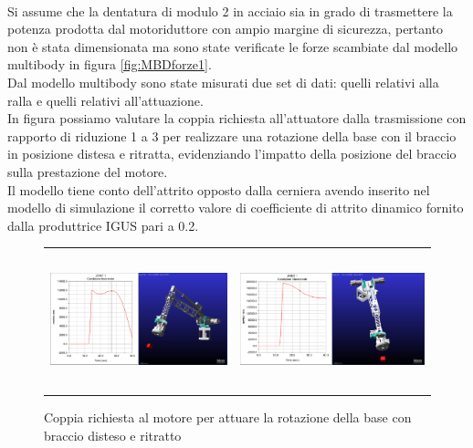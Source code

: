 \documentclass[%
corpo=11pt,
twoside,
 stile=classica,
oldstyle,
greek,%
]{toptesi}
\begin{document}
		\\
		Si assume che la dentatura di modulo 2 in acciaio sia in grado di trasmettere la potenza prodotta dal motoriduttore con ampio margine di sicurezza, pertanto non è stata dimensionata ma sono state verificate le forze scambiate dal modello multibody in figura \ref{fig:MBDforze1}. \\
		Dal modello multibody sono state misurati due set di dati: quelli relativi alla ralla e quelli relativi all'attuazione. \\
		In figura possiamo valutare la coppia richiesta all'attuatore dalla trasmissione con rapporto di riduzione 1 a 3 per realizzare una rotazione della base con il braccio in posizione distesa e ritratta, evidenziando l'impatto della posizione del braccio sulla prestazione del motore. \\
		Il modello tiene conto dell'attrito opposto dalla cerniera avendo inserito nel modello di simulazione il corretto valore di coefficiente di attrito dinamico fornito dalla produttrice IGUS pari a 0.2. 

		\begin{figure} [!ht]
			\centering
			\begin{tabular}{ll}
				\includegraphics[height=4cm,keepaspectratio]{Plots/BASE/joint1_FAVOREVOLE.png}
				&
				\includegraphics[height=4cm,keepaspectratio]{Plots/BASE/joint1_sfavorevole.png}
			\end{tabular}
			\caption{Coppia richiesta al motore per attuare la rotazione della base con braccio disteso e ritratto}
			\label{fig:MBDcoppia1}
		\end{figure}
	
\end{document}
